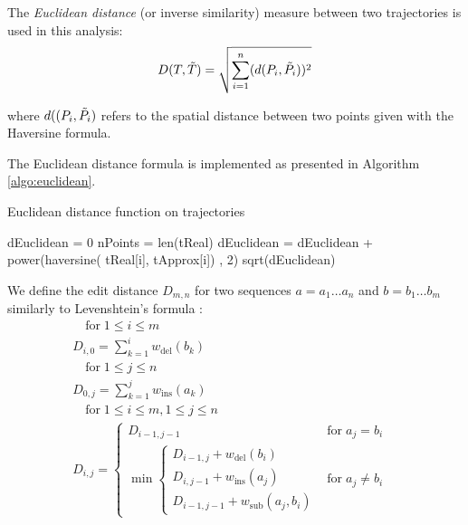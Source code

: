 The \textit{Euclidean distance} (or inverse similarity) measure between two trajectories is used in this analysis:
\[D(T,\Tilde{T}) = \sqrt{\sum_{i=1}^{n} (d(P_{i},\Tilde{P_{i}}))^{2}}\]

where $d((P_{i},\Tilde{P_{i}})$ refers to the spatial distance between two points given with the Haversine formula.

The Euclidean distance formula is implemented as presented in Algorithm \ref{algo:euclidean}.

\begin{algorithm}
\begin{algorithmic}
\caption{Euclidean distance function on trajectories} \label{algo:euclidean}
\State dEuclidean = 0
\State nPoints = len(tReal) 
    \State dEuclidean = dEuclidean + power(haversine(     
    \State tReal[i], tApprox[i]) , 2)
\EndFor
\Return sqrt(dEuclidean)
\EndFunction
\end{algorithmic}
\end{algorithm}

We define the edit distance $D_{m,n}$ for two sequences $a = a_1\ldots a_n$ and $b = b_1\ldots b_m$ similarly to Levenshtein's formula \cite{edit_dist}:
\[
\begin{aligned}
\quad {\text{for}}\;1\leq i\leq m \\
D_{{i,0}}=\sum _{{k=1}}^{{i}}w_{{\mathrm  {del}}}(b_{{k}}) \\
\quad {\text{for}}\;1\leq j\leq n & \\
D_{{0,j}}=\sum _{{k=1}}^{{j}}w_{{\mathrm  {ins}}}(a_{{k}}) \\
\quad {\text{for}}\;1\leq i\leq m,1\leq j\leq n \\
D_{{i,j}}={\begin{cases}D_{{i-1,j-1}}&{\text{for}}\;a_{{j}}=b_{{i}}\\
\min {\begin{cases}D_{{i-1,j}}+w_{{\mathrm  {del}}}(b_{{i}})\\D_{{i,j-1}}+w_{{\mathrm  {ins}}}(a_{{j}})\\D_{{i-1,j-1}}+w_{{\mathrm  {sub}}}(a_{{j}},b_{{i}})\end{cases}}&{\text{for}}\;a_{{j}}\neq b_{{i}}\end{cases}} 
\end{aligned}
\]

